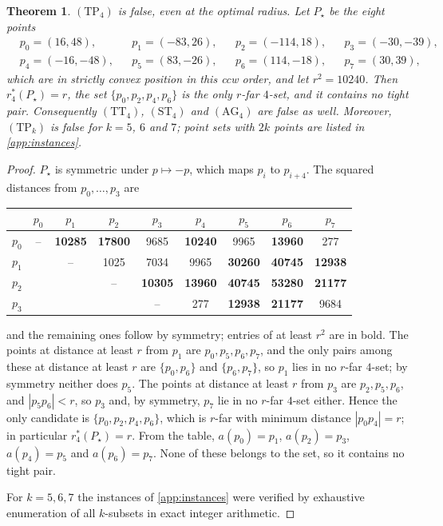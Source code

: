 \documentclass[11pt,a4paper]{article}
\newtheorem{theorem}{Theorem}
\theoremstyle{definition}
\theoremstyle{remark}
\newcommand{\rstar}{r^{*}}
\begin{document}
\begin{theorem}\label{thm:tightpair}
$(\mathrm{TP}_4)$ is false, even at the optimal radius. Let $P_\star$ be the
eight points
\begin{align*}
&p_0=(16,48), &&p_1=(-83,26), &&p_2=(-114,18), &&p_3=(-30,-39),\\
&p_4=(-16,-48), &&p_5=(83,-26), &&p_6=(114,-18), &&p_7=(30,39),
\end{align*}
which are in strictly convex position in this ccw order, and let
$r^2=10240$. Then $\rstar_4(P_\star)=r$, the set $\{p_0,p_2,p_4,p_6\}$ is the
only $r$-far $4$-set, and it contains no tight pair. Consequently
$(\mathrm{TT}_4)$, $(\mathrm{ST}_4)$ and $(\mathrm{AG}_4)$ are false as well.
Moreover, $(\mathrm{TP}_k)$ is false for $k=5$, $6$ and $7$; point sets with
$2k$ points are listed in \cref{app:instances}.
\end{theorem}
\begin{proof}
$P_\star$ is symmetric under $p\mapsto-p$, which maps $p_i$ to $p_{i+4}$. The
squared distances from $p_0,\dots,p_3$ are
\begin{center}\small
\begin{tabular}{@{}c|cccccccc@{}}
 & $p_0$ & $p_1$ & $p_2$ & $p_3$ & $p_4$ & $p_5$ & $p_6$ & $p_7$\\\midrule
$p_0$ & -- & \textbf{10285} & \textbf{17800} & 9685 & \textbf{10240} & 9965 & \textbf{13960} & 277\\
$p_1$ &  & -- & 1025 & 7034 & 9965 & \textbf{30260} & \textbf{40745} & \textbf{12938}\\
$p_2$ &  &  & -- & \textbf{10305} & \textbf{13960} & \textbf{40745} & \textbf{53280} & \textbf{21177}\\
$p_3$ &  &  &  & -- & 277 & \textbf{12938} & \textbf{21177} & 9684\\
\end{tabular}
\end{center}
and the remaining ones follow by symmetry; entries of at least $r^2$ are in
bold. The points at distance at least $r$ from $p_1$ are $p_0,p_5,p_6,p_7$,
and the only pairs among these at distance at least $r$ are $\{p_0,p_6\}$ and
$\{p_6,p_7\}$, so $p_1$ lies in no $r$-far $4$-set; by symmetry neither does
$p_5$. The points at distance at least $r$ from $p_3$ are $p_2,p_5,p_6$, and
$|p_5p_6|<r$, so $p_3$ and, by symmetry, $p_7$ lie in no $r$-far $4$-set
either. Hence the only candidate is $\{p_0,p_2,p_4,p_6\}$, which is $r$-far
with minimum distance $|p_0p_4|=r$; in particular $\rstar_4(P_\star)=r$. From
the table, $a(p_0)=p_1$, $a(p_2)=p_3$, $a(p_4)=p_5$ and $a(p_6)=p_7$. None of
these belongs to the set, so it contains no tight pair.

For $k=5,6,7$ the instances of \cref{app:instances} were verified by
exhaustive enumeration of all $k$-subsets in exact integer arithmetic.
\end{proof}
\end{document}
